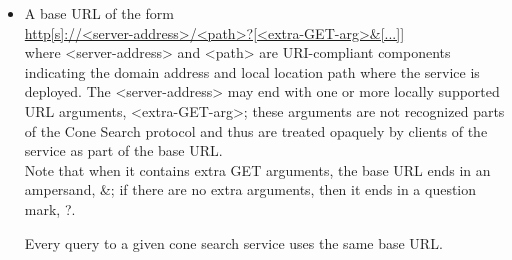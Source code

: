 \documentclass[11pt,a4paper]{ivoa}
\begin{document}
	\begin{itemize}
		\item A base URL of the form\\
		
		\url{http[s]://<server-address>/<path>?[<extra-GET-arg>&[...]]}\\
		
			where <server-address> and <path> are URI-compliant components
			indicating the domain address and local location path where the service
			is deployed. The <server-address> may end with one or more locally
			supported URL arguments, <extra-GET-arg>; these arguments are not
			recognized parts of the Cone Search protocol and thus are treated
			opaquely by clients of the service as part of the base URL.\\ Note that
			when it contains extra GET arguments, the base URL ends in an ampersand,
			\&; if there are no extra arguments, then it ends in a question mark,
			?.\\ 
		
		
		Every query to a given cone search service uses the same base URL.
		

\end{itemize}
\end{document}

